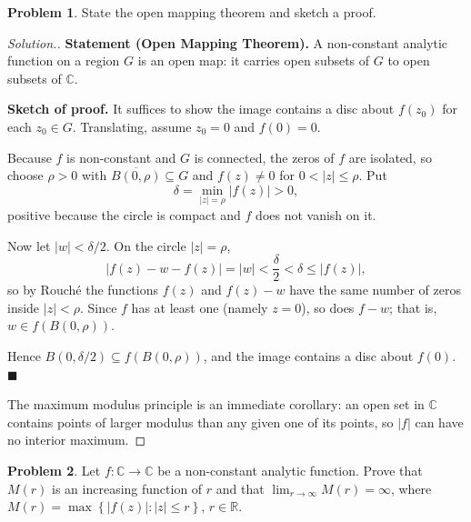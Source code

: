 \documentclass[11pt,a4paper]{article}
\theoremstyle{definition}
\newtheorem{problemx}{Problem}[section]
\newenvironment{problem}{\begin{problemx}}{\end{problemx}}
\newenvironment{solution}
  {\renewcommand{\qedsymbol}{}\begin{proof}[\textit{Solution}.]}
  {\end{proof}}
\begin{document}
\begin{problem}
State the open mapping theorem and sketch a proof.
\end{problem}

\begin{solution}
\textbf{Statement (Open Mapping Theorem).} A non-constant analytic function on a
region $G$ is an open map: it carries open subsets of $G$ to open subsets of
$\mathbb{C}$.

\textbf{Sketch of proof.} It suffices to show the image contains a disc about
$f(z_0)$ for each $z_0 \in G$. Translating, assume $z_0 = 0$ and $f(0) = 0$.

Because $f$ is non-constant and $G$ is connected, the zeros of $f$ are isolated, so
choose $\rho > 0$ with $\overline{B(0,\rho)} \subseteq G$ and $f(z) \neq 0$ for
$0 < \left|z\right| \leq \rho$. Put
$$\delta = \min_{\left|z\right| = \rho}\left|f(z)\right| > 0,$$
positive because the circle is compact and $f$ does not vanish on it.

Now let $\left|w\right| < \delta/2$. On the circle $\left|z\right| = \rho$,
$$\left|f(z) - w - f(z)\right| = \left|w\right| < \frac{\delta}{2} < \delta
\leq \left|f(z)\right| ,$$
so by Rouch\'e the functions $f(z)$ and $f(z) - w$ have the same number of zeros
inside $\left|z\right| < \rho$. Since $f$ has at least one (namely $z = 0$), so does
$f - w$; that is, $w \in f\left(B(0,\rho)\right)$.

Hence $B\left(0,\delta/2\right) \subseteq f\left(B(0,\rho)\right)$, and the image
contains a disc about $f(0)$. $\blacksquare$

The maximum modulus principle is an immediate corollary: an open set in
$\mathbb{C}$ contains points of larger modulus than any given one of its points, so
$\left|f\right|$ can have no interior maximum.
\end{solution}


\begin{problem}
Let $f : \mathbb{C} \rightarrow \mathbb{C}$ be a non-constant analytic function.
Prove that $M(r)$ is an increasing function of $r$ and that
$\lim_{r \rightarrow \infty} M(r) = \infty$, where
$M(r) = \max\left\{\left|f(z)\right| : \left|z\right| \leq r\right\}$,
$r \in \mathbb{R}$.
\end{problem}
\end{document}
